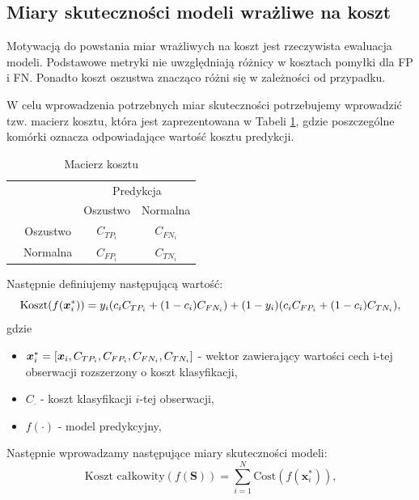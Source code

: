 \documentclass[inzynierska]{pwr_wmat_praca_dyplomowa}
\theoremstyle{plain}
\numberwithin{theorem}{chapter}
\theoremstyle{definition}
\numberwithin{theorem}{chapter}
\begin{document}
\subsection{Miary skuteczności modeli wrażliwe na koszt}
Motywacją do powstania miar wrażliwych na koszt jest rzeczywista ewaluacja modeli. Podstawowe metryki nie uwzględniają różnicy w kosztach pomyłki dla FP i FN. Ponadto koszt oszustwa znacząco różni się w zależności od przypadku.

W celu wprowadzenia potrzebnych miar skuteczności potrzebujemy wprowadzić tzw. macierz kosztu, która jest zaprezentowana w Tabeli \ref{macierz-kosztu}, gdzie poszczególne komórki oznacza odpowiadające wartość kosztu predykcji. 
\begin{table}[h]
	\begin{center}
		\makegapedcells
		\begin{tabular}{cc|cc}
			\multicolumn{2}{c}{}     &   \multicolumn{2}{c}{Predykcja} \\
			&            &   Oszustwo &   Normalna     \\ 
			\cline{2-4}
			\multirow{2}{*}{\rotatebox[origin=c]{90}{Prawda}} & Oszustwo   & $C_{TP_{i}}$         & $C_{FN_{i}}$              \\
			& Normalna   & $C_{FP_{i}}$         & $C_{TN_{i}}$              \\ 
			\cline{2-4}
		\end{tabular}
	\end{center}
	\caption{Macierz kosztu}
	\label{macierz-kosztu}
\end{table}
Następnie definiujemy następującą wartość:
$$ \text{Koszt}(f(\boldsymbol{x}_{i}^{*})) = y_i (c_i C_{TP_i} + (1-c_i)C_{FN_i}) + (1-y_i)(c_i C_{FP_i} + (1-c_i)C_{TN_i}) \text{,}$$
gdzie 
\begin{itemize}
	\item $\boldsymbol{x}_{i}^{*} = [\boldsymbol{x}_i, C_{TP_{i}}, C_{FP_{i}}, C_{FN_{i}}, C_{TN_{i}}]$ - wektor zawierający wartości cech i-tej obserwacji rozszerzony o koszt klasyfikacji,
	\item $C_{\cdot}$ - koszt klasyfikacji $i$-tej obserwacji,
	\item $f(\cdot)$ - model predykcyjny,
\end{itemize}{}
Następnie wprowadzamy następujące miary skuteczności modeli:
\begin{equation}
\label{koszt-calkowity}
\text{Koszt całkowity}(f(\boldsymbol{S})) = \sum_{i=1}^{N}\text{Cost}(f(\boldsymbol{x}_{i}^{*})) \text{,}
\end{equation} 
\end{document}
